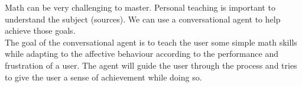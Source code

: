 Math can be very challenging to master. Personal teaching is important to understand the subject (sources). We can use a conversational agent to help achieve those goals.\\

\noindent The goal of the conversational agent is to teach the user some simple math skills while adapting to the affective behaviour according to the performance and frustration of a user. The agent will guide the user through the process and tries to give the user a sense of achievement while doing so.
